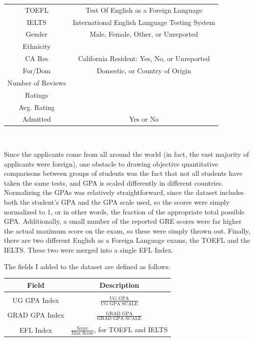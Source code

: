 \documentclass[]{article}
\begin{document}
\begin{tabular}{c|c}
		 TOEFL & Test Of English as a Foreign Language\\
		 IELTS & International English Language Testing System \\
		 Gender & Male, Female, Other, or Unreported\\
		 Ethnicity & \\
		 CA Res & California Resident: Yes, No, or Unreported\\
		 For/Dom & Domestic, or Country of Origin\\
		 Number of Reviews & \\ 
		 Ratings & \\ 
		 Avg. Rating & \\ 
		 Admitted & Yes or No\\
		\end{tabular} \\
		
		\par Since the applicants come from all around the world (in fact, the vast majority of applicants were foreign), one obstacle to drawing objective quantitative comparisons between groups of students was the fact that not all students have taken the same tests, and GPA is scaled differently in different countries. Normalizing the GPAs was relatively straightforward, since the dataset includes both the student's GPA and the GPA scale used, so the scores were simply normalized to 1, or in other words, the fraction of the appropriate total possible GPA. Additionally, a small number of the reported GRE scores were far higher the actual maximum score on the exam\cite{GRE}, so these were simply thrown out. Finally, there are two different English as a Foreign Language exams, the TOEFL and the IELTS. These two were merged into a single EFL Index. \\
		
		\par The fields I added to the dataset are defined as follows: \\
		
		\begin{tabular}{c|c}
		Field & Description \\ \hline \\
		UG GPA Index & $\frac {\text{UG GPA}}{\text{UG GPA SCALE}}$\\ \\
		GRAD GPA Index &  $\frac{\text{GRAD GPA}}{\text{GRAD GPA SCALE}}$\\ \\
		EFL Index & $\frac{\text{Score}}{\text{Max Score}}$, for TOEFL and IELTS\\		
		\end{tabular}
		
\end{document}
